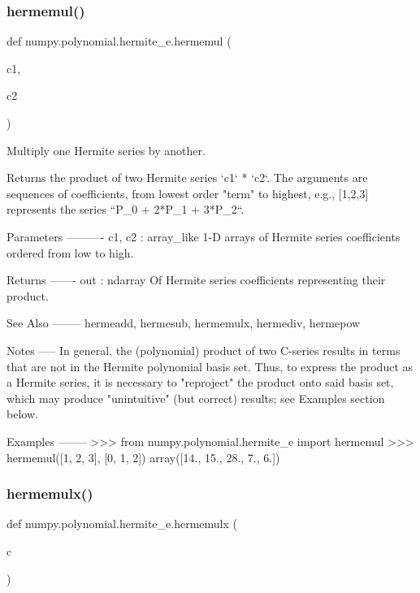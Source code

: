 \subsubsection{\texorpdfstring{hermemul()}{hermemul()}}
{\footnotesize\ttfamily def numpy.\+polynomial.\+hermite\+\_\+e.\+hermemul (\begin{DoxyParamCaption}\item[{}]{c1,  }\item[{}]{c2 }\end{DoxyParamCaption})}

\begin{DoxyVerb}Multiply one Hermite series by another.

Returns the product of two Hermite series `c1` * `c2`.  The arguments
are sequences of coefficients, from lowest order "term" to highest,
e.g., [1,2,3] represents the series ``P_0 + 2*P_1 + 3*P_2``.

Parameters
----------
c1, c2 : array_like
    1-D arrays of Hermite series coefficients ordered from low to
    high.

Returns
-------
out : ndarray
    Of Hermite series coefficients representing their product.

See Also
--------
hermeadd, hermesub, hermemulx, hermediv, hermepow

Notes
-----
In general, the (polynomial) product of two C-series results in terms
that are not in the Hermite polynomial basis set.  Thus, to express
the product as a Hermite series, it is necessary to "reproject" the
product onto said basis set, which may produce "unintuitive" (but
correct) results; see Examples section below.

Examples
--------
>>> from numpy.polynomial.hermite_e import hermemul
>>> hermemul([1, 2, 3], [0, 1, 2])
array([14.,  15.,  28.,   7.,   6.])\end{DoxyVerb}
 \mbox{\label{namespacenumpy_1_1polynomial_1_1hermite__e_ab9821e5cf05e8c8ee5f7504928f3a875}} 
\subsubsection{\texorpdfstring{hermemulx()}{hermemulx()}}
{\footnotesize\ttfamily def numpy.\+polynomial.\+hermite\+\_\+e.\+hermemulx (\begin{DoxyParamCaption}\item[{}]{c }\end{DoxyParamCaption})}

